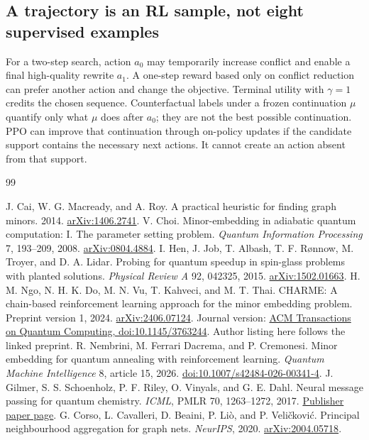 \documentclass[11pt,a4paper]{article}
\theoremstyle{definition}\newtheorem{definition}[proposition]{Definition}
\begin{document}
\subsection{A trajectory is an RL sample, not eight supervised examples}
For a two-step search, action $a_0$ may temporarily increase conflict and enable a final high-quality rewrite $a_1$. A one-step reward based only on conflict reduction can prefer another action and change the objective. Terminal utility with $\gamma=1$ credits the chosen sequence. Counterfactual labels under a frozen continuation $\mu$ quantify only what $\mu$ does after $a_0$; they are not the best possible continuation. PPO can improve that continuation through on-policy updates if the candidate support contains the necessary next actions. It cannot create an action absent from that support.
 \clearpage\begin{thebibliography}{99}
 J. Cai, W. G. Macready, and A. Roy. A practical heuristic for finding graph minors. 2014. \href{https://arxiv.org/abs/1406.2741}{arXiv:1406.2741}.
 V. Choi. Minor-embedding in adiabatic quantum computation: I. The parameter setting problem. \emph{Quantum Information Processing} 7, 193--209, 2008. \href{https://arxiv.org/abs/0804.4884}{arXiv:0804.4884}.
 I. Hen, J. Job, T. Albash, T. F. R\o nnow, M. Troyer, and D. A. Lidar. Probing for quantum speedup in spin-glass problems with planted solutions. \emph{Physical Review A} 92, 042325, 2015. \href{https://arxiv.org/abs/1502.01663}{arXiv:1502.01663}.
 H. M. Ngo, N. H. K. Do, M. N. Vu, T. Kahveci, and M. T. Thai. CHARME: A chain-based reinforcement learning approach for the minor embedding problem. Preprint version 1, 2024. \href{https://arxiv.org/abs/2406.07124}{arXiv:2406.07124}. Journal version: \href{https://doi.org/10.1145/3763244}{ACM Transactions on Quantum Computing, doi:10.1145/3763244}. Author listing here follows the linked preprint.
 R. Nembrini, M. Ferrari Dacrema, and P. Cremonesi. Minor embedding for quantum annealing with reinforcement learning. \emph{Quantum Machine Intelligence} 8, article 15, 2026. \href{https://doi.org/10.1007/s42484-026-00341-4}{doi:10.1007/s42484-026-00341-4}.
 J. Gilmer, S. S. Schoenholz, P. F. Riley, O. Vinyals, and G. E. Dahl. Neural message passing for quantum chemistry. \emph{ICML}, PMLR 70, 1263--1272, 2017. \href{https://proceedings.mlr.press/v70/gilmer17a.html}{Publisher paper page}.
 G. Corso, L. Cavalleri, D. Beaini, P. Li\`o, and P. Veli\v{c}kovi\'c. Principal neighbourhood aggregation for graph nets. \emph{NeurIPS}, 2020. \href{https://arxiv.org/abs/2004.05718}{arXiv:2004.05718}.

\end{thebibliography}
\end{document}
